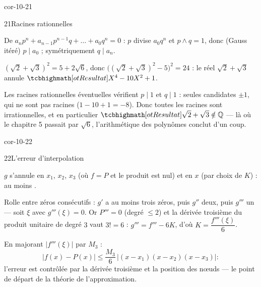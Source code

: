 \begin{blocLivre}{cor-10-21}
\begin{corrige}{21}{Racines rationnelles}
\begin{questions}
  \item De $a_n p^{n}+a_{n-1}p^{n-1}q+\dots+a_0q^{n}=0$ : $p$ divise
    $a_0q^{n}$ et $p\wedge q=1$, donc (Gauss itéré) $p\mid a_0$ ;
    symétriquement $q\mid a_n$.
  \item $(\sqrt2+\sqrt3)^{2}=5+2\sqrt6$, donc
    $\bigl((\sqrt2+\sqrt3)^{2}-5\bigr)^{2}=24$ : le réel $\sqrt2+\sqrt3$
    annule $\res{X^{4}-10X^{2}+1}$.
  \item Les racines rationnelles éventuelles vérifient $p\mid1$ et
    $q\mid1$ : seules candidates $\pm1$, qui ne sont pas racines
    ($1-10+1=-8$). Donc toutes les racines sont irrationnelles, et en
    particulier $\res{\sqrt2+\sqrt3\notin\Q}$ — là où le chapitre 5
    passait par $\sqrt6$, l'arithmétique des polynômes conclut d'un coup.
\end{questions}
\end{corrige}
\end{blocLivre}

\begin{blocLivre}{cor-10-22}
\begin{corrige}{22}{L'erreur d'interpolation}
\begin{questions}
  \item $g$ s'annule en $x_1$, $x_2$, $x_3$ (où $f=P$ et le produit est
    nul) et en $x$ (par choix de $K$) : au moins .
  \item Rolle entre zéros consécutifs : $g'$ a au moins trois zéros, puis
    $g''$ deux, puis $g'''$ un — soit $\xi$ avec $g'''(\xi)=0$. Or
    $P'''=0$ (degré $\leq2$) et la dérivée troisième du produit unitaire
    de degré $3$ vaut $3!=6$ : $g'''=f'''-6K$, d'où
    $K=\dfrac{f'''(\xi)}{6}$.
  \item En majorant $|f'''(\xi)|$ par $M_3$ :
    \[
      |f(x)-P(x)|\leq\frac{M_3}{6}\,|(x-x_1)(x-x_2)(x-x_3)| :
    \]
    l'erreur est contrôlée par la dérivée troisième et la position des
    nœuds — le point de départ de la théorie de l'approximation.
\end{questions}
\end{corrige}
\end{blocLivre}

